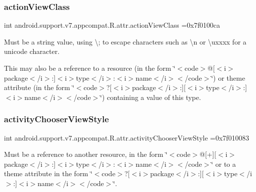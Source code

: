 \subsubsection{\texorpdfstring{action\+View\+Class}{actionViewClass}}
{\footnotesize\ttfamily int android.\+support.\+v7.\+appcompat.\+R.\+attr.\+action\+View\+Class =0x7f0100ca\hspace{0.3cm}{\ttfamily [static]}}

Must be a string value, using \textquotesingle{}\textbackslash{};\textquotesingle{} to escape characters such as \textquotesingle{}\textbackslash{}n\textquotesingle{} or \textquotesingle{}\textbackslash{}uxxxx\textquotesingle{} for a unicode character. 

This may also be a reference to a resource (in the form \char`\"{}$<$code$>$@\mbox{[}$<$i$>$package$<$/i$>$\+:\mbox{]}$<$i$>$type$<$/i$>$\+:$<$i$>$name$<$/i$>$$<$/code$>$\char`\"{}) or theme attribute (in the form \char`\"{}$<$code$>$?\mbox{[}$<$i$>$package$<$/i$>$\+:\mbox{]}\mbox{[}$<$i$>$type$<$/i$>$\+:\mbox{]}$<$i$>$name$<$/i$>$$<$/code$>$\char`\"{}) containing a value of this type. \mbox{\label{classandroid_1_1support_1_1v7_1_1appcompat_1_1R_1_1attr_ac1069fbab9c478efc0e749a230df462b}} 
\subsubsection{\texorpdfstring{activity\+Chooser\+View\+Style}{activityChooserViewStyle}}
{\footnotesize\ttfamily int android.\+support.\+v7.\+appcompat.\+R.\+attr.\+activity\+Chooser\+View\+Style =0x7f010083\hspace{0.3cm}{\ttfamily [static]}}

Must be a reference to another resource, in the form \char`\"{}$<$code$>$@\mbox{[}+\mbox{]}\mbox{[}$<$i$>$package$<$/i$>$\+:\mbox{]}$<$i$>$type$<$/i$>$\+:$<$i$>$name$<$/i$>$$<$/code$>$\char`\"{} or to a theme attribute in the form \char`\"{}$<$code$>$?\mbox{[}$<$i$>$package$<$/i$>$\+:\mbox{]}\mbox{[}$<$i$>$type$<$/i$>$\+:\mbox{]}$<$i$>$name$<$/i$>$$<$/code$>$\char`\"{}. \mbox{\label{classandroid_1_1support_1_1v7_1_1appcompat_1_1R_1_1attr_aaa6f31eaee143e1e1907c80497272f38}} 
